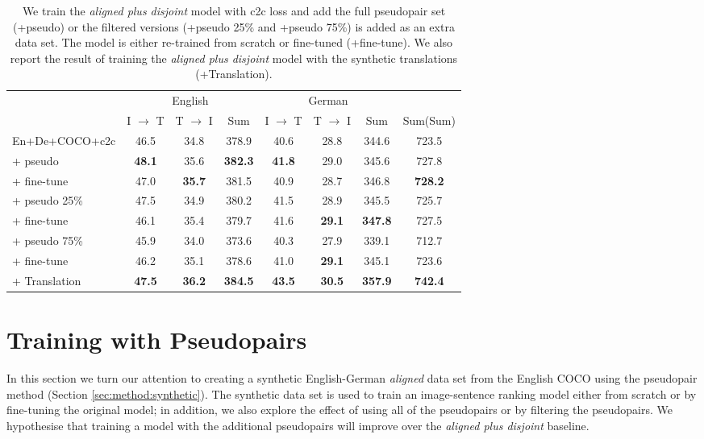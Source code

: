 \begin{table*}[ht]
    \centering
    \renewcommand{\arraystretch}{1.0}
    	\footnotesize
    \begin{tabular}{lccccccc}
        \toprule
         & \multicolumn{3}{c}{English}  & \multicolumn{3}{c}{German}\\
         \cmidrule(lr){2-4} \cmidrule(lr){5-7}
         & I $\rightarrow$ T & T $\rightarrow$ I & Sum 
         & I $\rightarrow$ T & T $\rightarrow$ I & Sum & Sum(Sum)\\
         \midrule
         En+De+COCO+c2c & 46.5 & 34.8 & 378.9 & 40.6 & 28.8 & 344.6 & 723.5\\
         \: \: + pseudo & \textbf{48.1}  & 35.6 & \textbf{382.3} & \textbf{41.8}  & 29.0  & 345.6 & 727.8 \\
          \: \: \: + fine-tune & 47.0 & \textbf{35.7}  & 381.5  & 40.9  & 28.7 & 346.8 & \textbf{728.2} \\
          \: \: + pseudo 25\% &  47.5  & 34.9 &  380.2 &  41.5 & 28.9 &  345.5 & 725.7\\
           \: \: \: + fine-tune &  46.1 & 35.4 &  379.7  &  41.6 & \textbf{29.1} & \textbf{347.8} & 727.5\\
          \: \: + pseudo 75\% &  45.9  & 34.0 & 373.6  & 40.3  & 27.9 &  339.1 & 712.7\\
          \: \: \: + fine-tune & 46.2  & 35.1 & 378.6  &  41.0 & \textbf{29.1}  &  345.1 & 723.6\\
          \hdashline
          \: + Translation & \textbf{47.5} & \textbf{36.2} & \textbf{384.5} & \textbf{43.5} & \textbf{30.5} & \textbf{357.9} & \textbf{742.4}\\
         \bottomrule
    \end{tabular}
    \caption{We train the \emph{aligned plus disjoint} model with 
    c2c loss and add the full pseudopair set (+pseudo) or the filtered versions (+pseudo 25\% and +pseudo 75\%) is added as an extra data set. The model is either re-trained from scratch or fine-tuned (+fine-tune). We also report the result of training the \emph{aligned plus disjoint} model with the synthetic translations (+Translation).}
    \label{tab:pseudoalignedplus}
\end{table*}

\section{Training with Pseudopairs}
\label{sec:pseudo}

In this section we turn our attention to creating a synthetic English-German \emph{aligned} data set from the English COCO using the pseudopair method (Section \ref{sec:method:synthetic}). The synthetic data set is used to train an image-sentence ranking model either from scratch or by fine-tuning the original model; in addition, we also explore the effect of using all of the pseudopairs or by filtering the pseudopairs. We hypothesise that training a model with the additional pseudopairs
will improve over the \textit{aligned plus disjoint} baseline.

